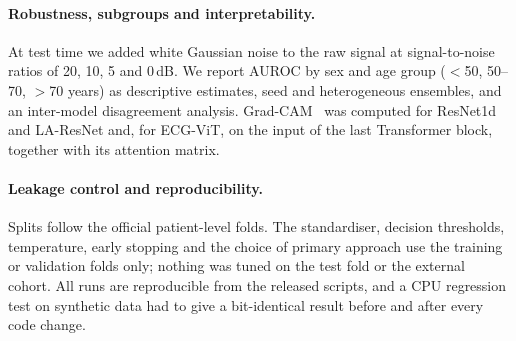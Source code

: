 \paragraph{Robustness, subgroups and interpretability.} At test time we added white Gaussian noise to the raw signal at signal-to-noise ratios of 20, 10, 5 and 0\,dB. We report AUROC by sex and age group ($<$50, 50--70, $>$70 years) as descriptive estimates, seed and heterogeneous ensembles, and an inter-model disagreement analysis. Grad-CAM~\cite{selvaraju2017gradcam} was computed for ResNet1d and LA-ResNet and, for ECG-ViT, on the input of the last Transformer block, together with its attention matrix.

\paragraph{Leakage control and reproducibility.} Splits follow the official patient-level folds. The standardiser, decision thresholds, temperature, early stopping and the choice of primary approach use the training or validation folds only; nothing was tuned on the test fold or the external cohort. All runs are reproducible from the released scripts, and a CPU regression test on synthetic data had to give a bit-identical result before and after every code change.
